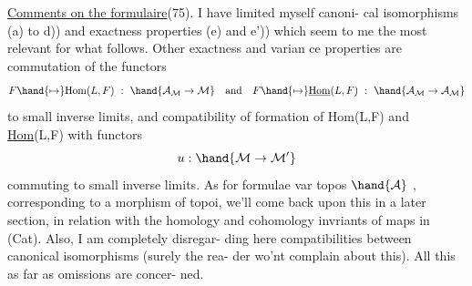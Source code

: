 \uline{Comments on the formulaire}(75). I have limited myself   canoni-%
cal isomorphisms (a) to d)) and exactness properties (e) and e')) which
seem to me the most relevant for what follows. Other exactness and varian
ce properties are commutation of the functors
\[ F \hand{\mapsto} \mathrm{Hom}(L,F) \ : \ \hand{\mathcal{A}_{\mathcal{M}} \rightarrow \mathcal{M}} \quad \text{and} \quad F \hand{\mapsto} \underline{\mathrm{Hom}}(L,F) \ : \ \hand{\mathcal{A}_{\mathcal{M}} \rightarrow \mathcal{A}_{\mathcal{M}}} \]
to small inverse limits, and compatibility of formation of Hom(L,F) and
\uline{Hom}(L,F) with functors
\[ u : \hand{\mathcal{M} \rightarrow \mathcal{M}'} \]
commuting to small inverse limits. As for formulae   var
 topos $\hand{\mathcal{A}}$ , corresponding to a morphism of topoi, we'll come
back upon this in a later section, in relation with the homology and
cohomology invriants of maps in (Cat). Also, I am completely disregar-%
ding here compatibilities between canonical isomorphisms (surely the rea-%
der wo'nt complain about this). All this as far as omissions are concer-%
ned.

